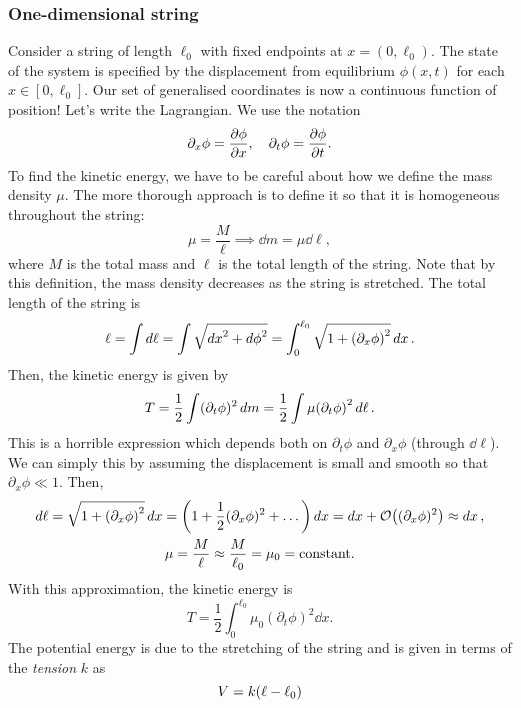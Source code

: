 \documentclass{article}
\begin{document}
\subsubsection*{One-dimensional string}
Consider a string of length $ \ell_{0} $ with fixed endpoints at $ x=(0, \ell_{0}) $. The state of the system is specified by the displacement from equilibrium $ \phi(x,t) $ for each $ x \in [0,\ell_{0}] $. Our set of generalised coordinates is now a continuous function of position! Let's write the Lagrangian. We use the notation
\[
	\partial_{x} \phi = \pdv{\phi}{x}, \quad \partial_{t} \phi = \pdv{\phi}{t}.
\]
To find the kinetic energy, we have to be careful about how we define the mass density $ \mu $. The more thorough approach is to define it so that it is homogeneous throughout the string:
\[
	\mu = \frac{M}{\ell} \implies \dd{m} = \mu \dd{\ell},
\]
where $ M $ is the total mass and $ \ell $ is the total length of the string. Note that by this definition, the mass density decreases as the string is stretched. The total length of the string is
\begin{equation}
	\ell = \int \dd{\ell} = \int \sqrt{\dd{x}^{2} + \dd{\phi}^{2}} = \int_{0}^{\ell_0} \sqrt{1 + \qty(\partial_{x}\phi)^{2}} \dd{x}.
\end{equation} 
Then, the kinetic energy is given by
\begin{equation}
	T = \frac{1}{2} \int (\partial_{t}\phi)^{2} \dd{m} = \frac{1}{2} \int \mu \qty(\partial_{t}\phi)^{2} \dd{\ell}.
\end{equation}
This is a horrible expression which depends both on $ \partial_{t} \phi $ and $ \partial_{x}\phi $ (through $ \dd{\ell} $). We can simply this by assuming the displacement is small and smooth so that $ \partial_{x}\phi \ll 1 $. Then,
\begin{gather}
	\dd{\ell} = \sqrt{1+\qty(\partial_{x}\phi)^{2}} \dd{x} = \qty(1 + \frac{1}{2}(\partial_{x}\phi)^{2} + \dots) \dd{x} = \dd{x} + \order{(\partial_{x}\phi)^{2}} \approx \dd{x}, \\
	\mu = \frac{M}{\ell} \approx \frac{M}{\ell_{0}} = \mu_{0} = \text{constant}.
\end{gather}
With this approximation, the kinetic energy is
\begin{equation}
	T = \frac{1}{2} \int_{0}^{\ell_{0}} \mu_{0} (\partial_{t}\phi)^{2} \dd{x}.
\end{equation}
The potential energy is due to the stretching of the string and is given in terms of the \textit{tension} $ k $ as
\begin{equation}
	V = k \qty(\ell - \ell_{0})
\end{equation}
\end{document}

